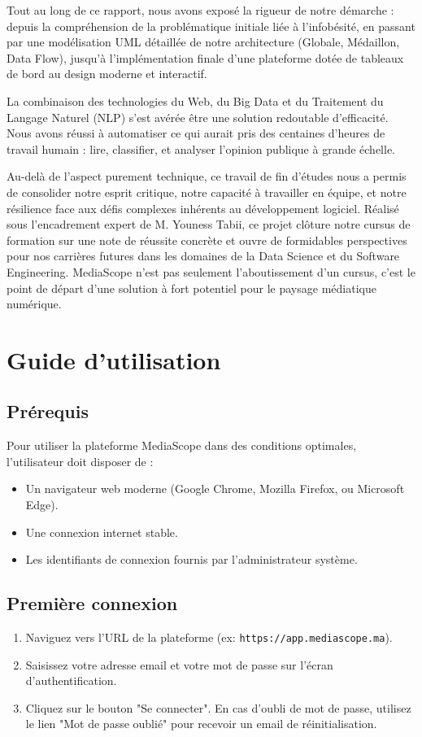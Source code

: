 \documentclass[12pt,a4paper,oneside]{report}
\begin{document}
Tout au long de ce rapport, nous avons exposé la rigueur de notre démarche : depuis la compréhension de la problématique initiale liée à l'infobésité, en passant par une modélisation UML détaillée de notre architecture (Globale, Médaillon, Data Flow), jusqu'à l'implémentation finale d'une plateforme dotée de tableaux de bord au design moderne et interactif.

La combinaison des technologies du Web, du Big Data et du Traitement du Langage Naturel (NLP) s'est avérée être une solution redoutable d'efficacité. Nous avons réussi à automatiser ce qui aurait pris des centaines d'heures de travail humain : lire, classifier, et analyser l'opinion publique à grande échelle. 

Au-delà de l'aspect purement technique, ce travail de fin d'études nous a permis de consolider notre esprit critique, notre capacité à travailler en équipe, et notre résilience face aux défis complexes inhérents au développement logiciel. Réalisé sous l'encadrement expert de M. Youness Tabii, ce projet clôture notre cursus de formation sur une note de réussite concrète et ouvre de formidables perspectives pour nos carrières futures dans les domaines de la Data Science et du Software Engineering. MediaScope n'est pas seulement l'aboutissement d'un cursus, c'est le point de départ d'une solution à fort potentiel pour le paysage médiatique numérique.

\newpage

\appendix
\chapter{Guide d'utilisation}
\section{Prérequis}
Pour utiliser la plateforme MediaScope dans des conditions optimales, l'utilisateur doit disposer de :
\begin{itemize}
    \item Un navigateur web moderne (Google Chrome, Mozilla Firefox, ou Microsoft Edge).
    \item Une connexion internet stable.
    \item Les identifiants de connexion fournis par l'administrateur système.
\end{itemize}

\section{Première connexion}
\begin{enumerate}
    \item Naviguez vers l'URL de la plateforme (ex: \texttt{https://app.mediascope.ma}).
    \item Saisissez votre adresse email et votre mot de passe sur l'écran d'authentification.
    \item Cliquez sur le bouton "Se connecter". En cas d'oubli de mot de passe, utilisez le lien "Mot de passe oublié" pour recevoir un email de réinitialisation.
\end{enumerate}
\end{document}
